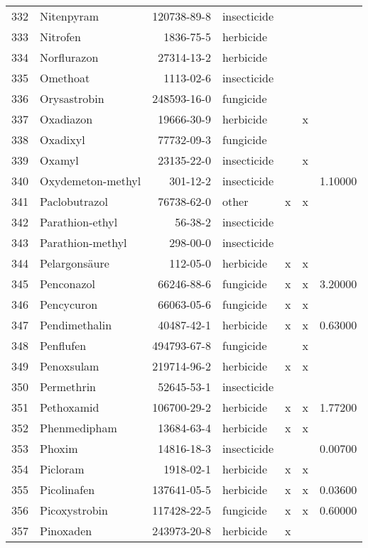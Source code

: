 \begin{longtable}{lp{4cm}rlp{1.3cm}p{1.3cm}p{1.5cm}}
  332 & Nitenpyram & 120738-89-8 & insecticide &  &  &  \\ 
  333 & Nitrofen & 1836-75-5 & herbicide &  &  &  \\ 
  334 & Norflurazon & 27314-13-2 & herbicide &  &  &  \\ 
  335 & Omethoat & 1113-02-6 & insecticide &  &  &  \\ 
  336 & Orysastrobin & 248593-16-0 & fungicide &  &  &  \\ 
  337 & Oxadiazon & 19666-30-9 & herbicide &  & x &  \\ 
  338 & Oxadixyl & 77732-09-3 & fungicide &  &  &  \\ 
  339 & Oxamyl & 23135-22-0 & insecticide &  & x &  \\ 
  340 & Oxydemeton-methyl & 301-12-2 & insecticide &  &  & 1.10000 \\ 
  341 & Paclobutrazol & 76738-62-0 & other & x & x &  \\ 
  342 & Parathion-ethyl & 56-38-2 & insecticide &  &  &  \\ 
  343 & Parathion-methyl & 298-00-0 & insecticide &  &  &  \\ 
  344 & Pelargonsäure & 112-05-0 & herbicide & x & x &  \\ 
  345 & Penconazol & 66246-88-6 & fungicide & x & x & 3.20000 \\ 
  346 & Pencycuron & 66063-05-6 & fungicide & x & x &  \\ 
  347 & Pendimethalin & 40487-42-1 & herbicide & x & x & 0.63000 \\ 
  348 & Penflufen & 494793-67-8 & fungicide &  & x &  \\ 
  349 & Penoxsulam & 219714-96-2 & herbicide & x & x &  \\ 
  350 & Permethrin & 52645-53-1 & insecticide &  &  &  \\ 
  351 & Pethoxamid & 106700-29-2 & herbicide & x & x & 1.77200 \\ 
  352 & Phenmedipham & 13684-63-4 & herbicide & x & x &  \\ 
  353 & Phoxim & 14816-18-3 & insecticide &  &  & 0.00700 \\ 
  354 & Picloram & 1918-02-1 & herbicide & x & x &  \\ 
  355 & Picolinafen & 137641-05-5 & herbicide & x & x & 0.03600 \\ 
  356 & Picoxystrobin & 117428-22-5 & fungicide & x & x & 0.60000 \\ 
  357 & Pinoxaden & 243973-20-8 & herbicide & x &  &  \\ 

\end{longtable}
